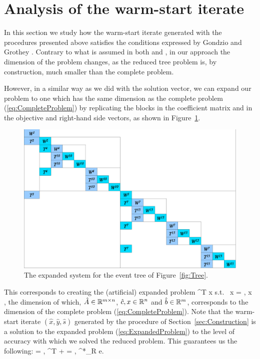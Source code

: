 %
%
\section{Analysis of the warm-start iterate}
\label{sec:Analysis}

In this section we study how the warm-start iterate generated with 
the procedures presented above satisfies the conditions expressed by 
Gondzio and Grothey \cite{GondzioGrothey03}. 
Contrary to what is assumed in both \cite{YildirimWright} and 
\cite{GondzioGrothey03}, in our approach the dimension of the problem changes, 
as the reduced tree problem is, by construction, much smaller than the 
complete problem.

However, in a similar way as we did with the solution vector, 
we can expand our problem to one which has the same dimension 
as the complete problem (\ref{eq:CompleteProblem}) by replicating
the blocks in the coefficient matrix and in the objective and right-hand 
side vectors, as shown in Figure~\ref{fig:ExpandedSystem}.
%
\begin{figure}[ht]
  \begin{center}
    \includegraphics[scale=.50]{figures/expandedsystem.eps}
    \caption{The expanded system for the event tree of Figure~\ref{fig:Tree}.}
    \label{fig:ExpandedSystem}
  \end{center}
  \vspace{-3ex}
\end{figure}

This corresponds to creating the (artificial) expanded problem
\be \label{eq:ExpandedProblem}
\min\; ^T x \;\quad \mbox{s.t. }\;  x = ,
    \; x ,
\ee
the dimension of which, $\hat{A} \in \mathbb{R}^{m\times n}$, 
$\hat{c}, x \in \mathbb{R}^{n}$ and $\hat{b} \in \mathbb{R}^{m}$,
corresponds to the dimension of the complete problem 
(\ref{eq:CompleteProblem}).
%
Note that the warm-start iterate $(\hat{x},\hat{y},\hat{s})$
generated by the procedure of Section~\ref{sec:Construction}
is a solution to the expanded problem (\ref{eq:ExpandedProblem}) 
to the level of accuracy with which we solved the reduced problem.
This guarantees us the following:
\be  \label{eq:ExpandedSolutionProperties}
  = , \qquad
{}^T  +  = , \qquad
{}  \approx \mu^*_R e.
\ee

